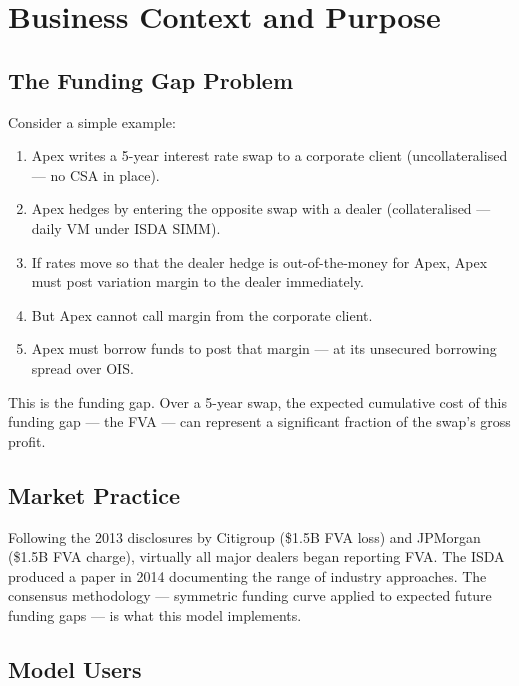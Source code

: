 \documentclass[11pt,a4paper]{article}
\begin{document}
\section{Business Context and Purpose}

\subsection{The Funding Gap Problem}

Consider a simple example:
\begin{enumerate}[leftmargin=*]
  \item Apex writes a 5-year interest rate swap to a corporate client (uncollateralised --- no CSA in place).
  \item Apex hedges by entering the opposite swap with a dealer (collateralised --- daily VM under ISDA SIMM).
  \item If rates move so that the dealer hedge is out-of-the-money for Apex, Apex must post variation margin to the dealer immediately.
  \item But Apex cannot call margin from the corporate client.
  \item Apex must borrow funds to post that margin --- at its unsecured borrowing spread over OIS.
\end{enumerate}

This is the funding gap. Over a 5-year swap, the expected cumulative cost of this funding gap
--- the FVA --- can represent a significant fraction of the swap's gross profit.

\subsection{Market Practice}

Following the 2013 disclosures by Citigroup (\$1.5B FVA loss) and JPMorgan (\$1.5B FVA
charge), virtually all major dealers began reporting FVA. The ISDA produced a paper in 2014
documenting the range of industry approaches. The consensus methodology --- symmetric funding
curve applied to expected future funding gaps --- is what this model implements.

\subsection{Model Users}
\end{document}
